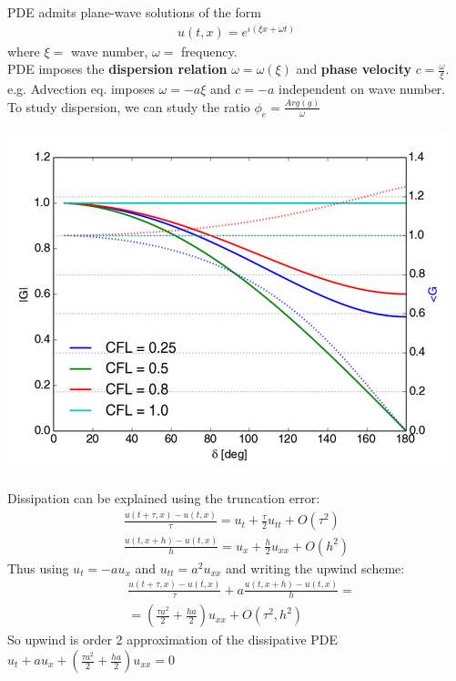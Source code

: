 \documentclass{beamer}
\begin{document}
\begin{frame}
PDE admits plane-wave solutions of the form
\begin{align*}
u(t,x) = e^{\iota(\xi x + \omega t)}
\end{align*}
where $\xi = $ wave number, $\omega = $ frequency. \\
PDE imposes the \textbf{dispersion relation} $\omega = \omega(\xi)$ and \textbf{phase velocity} $c = \frac{\omega}{\xi}$. e.g. Advection eq. imposes $\omega = -a\xi$ and $c = -a$ independent on wave number. \\
To study dispersion, we can study the ratio $\phi_e = \frac{Arg(g)}{\omega}$
\end{frame}
\begin{frame}
\cite{ebook}
\includegraphics[width=\textwidth]{up_g}
\end{frame}
\begin{frame}
Dissipation can be explained using the truncation error:
\begin{align*}
\frac{u(t+\tau,x) - u(t,x)}{\tau} = u_t + \frac{\tau}{2}u_{tt} + O(\tau^2)
\\
\frac{u(t,x + h) - u(t,x)}{h} = u_x + \frac{h}{2}u_{xx} + O(h^2)
\end{align*}
Thus using $u_t = -au_x$ and $u_{tt} = a^2u_{xx}$ and writing the upwind scheme:
\begin{align*}
& \frac{u(t+\tau,x) - u(t,x)}{\tau} + a\frac{u(t,x + h) - u(t,x)}{h} = \\
& = \left(\frac{\tau a^2}{2}+ \frac{ha}{2}\right) u_{xx} + O(\tau^2,h^2) 
\end{align*}
So upwind is order 2 approximation of the dissipative PDE $u_t +au_x + \left(\frac{\tau a^2}{2}+ \frac{ha}{2}\right) u_{xx} = 0$
\end{frame}
\end{document}
